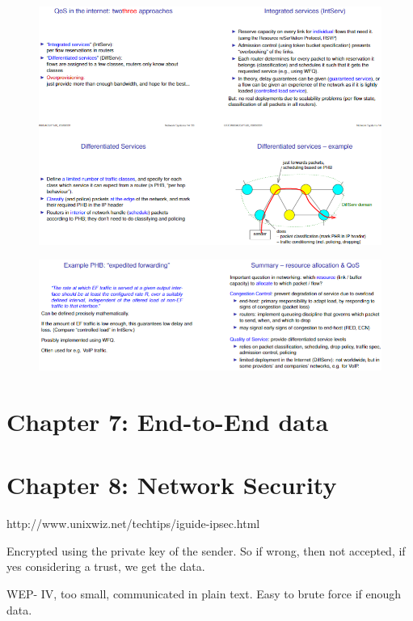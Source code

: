 \documentclass[11pt, a4paper]{article}
\begin{document}
\begin{figure}[H]
    \centering
    \includegraphics[width = \textwidth]{Pictures/IntServDiffServ.png}
\end{figure}

\begin{figure}[H]
    \centering
    \includegraphics[width = \textwidth]{Pictures/IntServDiffServ2.png}
\end{figure}

\section{Chapter 7: End-to-End data}


\section{Chapter 8: Network Security}
http://www.unixwiz.net/techtips/iguide-ipsec.html

Encrypted using the private key of the sender. So if wrong, then not accepted, if yes considering a trust, we get the data.

WEP- IV, too small, communicated in plain text. Easy to brute force if enough data.
\end{document}
